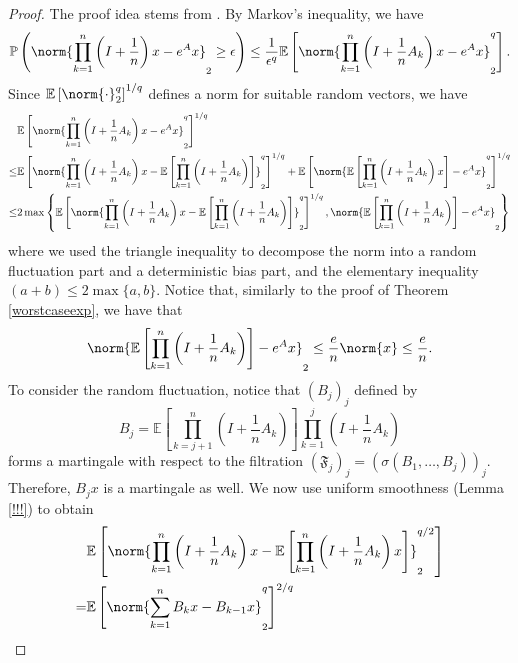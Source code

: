 \begin{proof}
    The proof idea stems from \cite{chen2021product}. By Markov's inequality, we have 
    \[ \mathbb{P}\left( \norm{ \prod_{k=1}^{n} \left(I+\frac{1}{n} \right)x- e^{A}x}_{2} \geq \epsilon\right)  \leq \frac{1}{\epsilon ^{q}} \mathbb{E}\left[\norm{\prod_{k=1}^{n}\left(I+\frac{1}{n}A_k\right)x-e^{A}x}_{2}^{q}\right].\]
    Since \( \mathbb{E}\left[ \norm{ \cdot }_{2}^{q}\right]^{1/q} \) defines a norm for suitable random vectors, we have 
    \begin{align*}
      &\mathbb{E}\left[\norm{ \prod_{k=1}^{n} \left(I+\frac{1}{n}A_k\right)x- e^{A}x}_{2}^{q}\right]^{1/q}  \\
      \leq & 
      \mathbb{E}\left[ \norm{\prod_{k=1}^{n} \left(I+\frac{1}{n}A_k\right)x - \mathbb{E}\left[ \prod_{k=1}^{n} \left(I+\frac{1}{n}A_k\right)\right]}_{2}^{q}\right]^{1/q} + \mathbb{E} \left[\norm{ \mathbb{E}\left[ \prod_{k=1}^{n} \left(I+\frac{1}{n}A_k\right)x\right]-e^{A}x}_{2}^{q}\right]^{1/q} \\
      \leq & 2 \max \left\{  \mathbb{E} \left[\norm{\prod_{k=1}^{n} \left(I+\frac{1}{n}A_k\right)x - \mathbb{E}\left[\prod_{k=1}^{n}\left(I+\frac{1}{n}A_k\right)\right]}_{2}^{q}\right]^{1/q}, \norm{\mathbb{E}\left[ \prod_{k=1}^{n}\left(I+\frac{1}{n}A_k\right)\right]- e^{A}x}_{2}\right\}
    \end{align*}
    where we used the triangle inequality to decompose the norm into a random fluctuation part and a deterministic bias part, and the elementary inequality \( (a+b) \leq 2 \max \{a,b\} \).  Notice that, similarly to the proof of Theorem \ref{worstcaseexp}, we have that 
    \[ \norm{\mathbb{E}\left[ \prod_{k=1}^{n}\left(I+\frac{1}{n}A_k\right)\right]- e^{A}x}_{2} \leq  \frac{e}{n} \norm{x} \leq \frac{e}{n}.\] 
    To consider the random fluctuation, notice that 
    \( (B_j)_j \) defined by 
    \[ B_j = \mathbb{E}\left[\prod_{k=j+1}^{n} \left(I+\frac{1}{n}A_k\right)\right] \prod_{k=1}^{j} \left(I+\frac{1}{n}A_k\right) \] 
    forms a martingale with respect to the filtration \( (\mathfrak{F}_j)_j = (\sigma(B_1,\dots, B_j))_j \). Therefore, \( B_jx \) is a martingale as well. We now use uniform smoothness (Lemma \ref{!!!}) to obtain 
    \begin{align*}
      & \mathbb{E}\left[ \norm{ \prod_{k=1}^{n} \left(I+\frac{1}{n}A_k\right)x - \mathbb{E}\left[\prod_{k=1}^{n}\left(I+\frac{1}{n}A_k\right)x \right]}_{2}^{q/2}\right]  \\
      =& \mathbb{E}\left[ \norm{\sum_{k=1}^{n} B_kx - B_{k-1}x }_{2}^{q}\right]^{2/q} \\ 

\end{align*}
\end{proof}
